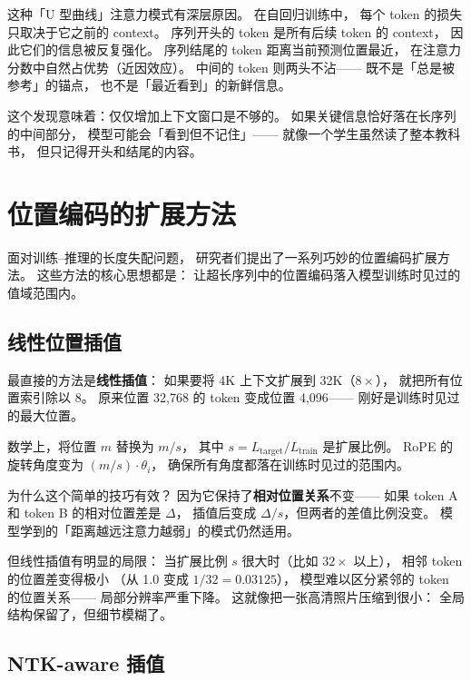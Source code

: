 
这种「U 型曲线」注意力模式有深层原因。
在自回归训练中，
每个 token 的损失只取决于它之前的 context。
序列开头的 token 是所有后续 token 的 context，
因此它们的信息被反复强化。
序列结尾的 token 距离当前预测位置最近，
在注意力分数中自然占优势（近因效应）。
中间的 token 则两头不沾——
既不是「总是被参考」的锚点，
也不是「最近看到」的新鲜信息。

这个发现意味着：仅仅增加上下文窗口是不够的。
如果关键信息恰好落在长序列的中间部分，
模型可能会「看到但不记住」——
就像一个学生虽然读了整本教科书，
但只记得开头和结尾的内容。

\section{位置编码的扩展方法}

面对训练--推理的长度失配问题，
研究者们提出了一系列巧妙的位置编码扩展方法。
这些方法的核心思想都是：
让超长序列中的位置编码落入模型训练时见过的值域范围内。

\subsection{线性位置插值}

最直接的方法是\textbf{线性插值}：
如果要将 4K 上下文扩展到 32K（$8\times$），
就把所有位置索引除以 8。
原来位置 32,768 的 token 变成位置 4,096——
刚好是训练时见过的最大位置。


数学上，将位置 $m$ 替换为 $m/s$，
其中 $s = L_{\text{target}} / L_{\text{train}}$ 是扩展比例。
RoPE 的旋转角度变为 $(m/s) \cdot \theta_i$，
确保所有角度都落在训练时见过的范围内。

为什么这个简单的技巧有效？
因为它保持了\textbf{相对位置关系}不变——
如果 token A 和 token B 的相对位置差是 $\Delta$，
插值后变成 $\Delta / s$，但两者的差值比例没变。
模型学到的「距离越远注意力越弱」的模式仍然适用。

但线性插值有明显的局限：
当扩展比例 $s$ 很大时（比如 $32\times$ 以上），
相邻 token 的位置差变得极小
（从 1.0 变成 $1/32 = 0.03125$），
模型难以区分紧邻的 token 的位置关系——
局部分辨率严重下降。
这就像把一张高清照片压缩到很小：
全局结构保留了，但细节模糊了。

\subsection{NTK-aware 插值}

